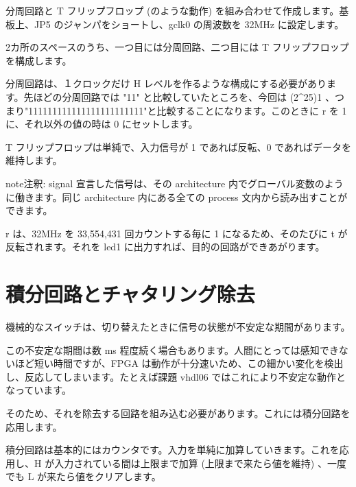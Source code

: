 \documentclass[letterpaper,10pt,dvipdfmx]{sphinxmanual}
\begin{document}
分周回路と T フリップフロップ (のような動作) を組み合わせて作成します。基板上、JP5 のジャンパをショートし、gclk0 の周波数を 32MHz に設定します。

2カ所のスペースのうち、一つ目には分周回路、二つ目には T フリップフロップを構成します。

分周回路は、１クロックだけ H レベルを作るような構成にする必要があります。先ほどの分周回路では "11" と比較していたところを、今回は (2\textasciicircum{}25)\sphinxhyphen{}1 、つまり"111111111111111111111111"と比較することになります。このときに r を 1 に、それ以外の値の時は 0 にセットします。

T フリップフロップは単純で、入力信号が 1 であれば反転、0 であればデータを維持します。

\begin{sphinxadmonition}{note}{注釈:}
signal 宣言した信号は、その architecture 内でグローバル変数のように働きます。同じ architecture 内にある全ての process 文内から読み出すことができます。
\end{sphinxadmonition}

r は、32MHz を 33,554,431 回カウントする毎に 1 になるため、そのたびに t が反転されます。それを led1 に出力すれば、目的の回路ができあがります。


\section{積分回路とチャタリング除去}
\label{\detokenize{05_try:id18}}
機械的なスイッチは、切り替えたときに信号の状態が不安定な期間があります。

\begin{figure}[htbp]
\centering

\noindent{}
\end{figure}

この不安定な期間は数 ms 程度続く場合もあります。人間にとっては感知できないほど短い時間ですが、FPGA は動作が十分速いため、この細かい変化を検出し、反応してしまいます。たとえば課題 vhdl06 ではこれにより不安定な動作となっています。

そのため、それを除去する回路を組み込む必要があります。これには積分回路を応用します。

\begin{figure}[htbp]
\centering

\noindent{}
\end{figure}

積分回路は基本的にはカウンタです。入力を単純に加算していきます。これを応用し、H が入力されている間は上限まで加算 (上限まで来たら値を維持) 、一度でも L が来たら値をクリアします。
\end{document}
